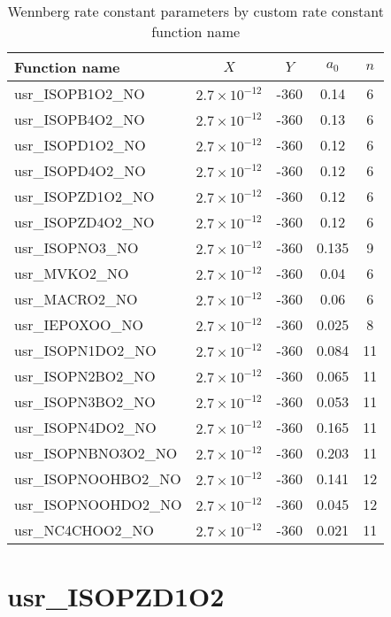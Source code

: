 \documentclass[titlepage]{article}
\begin{document}
\begin{table}
\centering
\caption{Wennberg  rate constant parameters by custom rate constant function name}
\label{tab:wennberg}
\begin{tabular}{l c c c c}
Function name & $X$ & $Y$ & $a_0$ & $n$ \\
\hline
usr\_ISOPB1O2\_NO   & $2.7 \times 10^{-12}$ & -360 & 0.14   & 6 \\
usr\_ISOPB4O2\_NO   & $2.7 \times 10^{-12}$ & -360 & 0.13   & 6 \\
usr\_ISOPD1O2\_NO   & $2.7 \times 10^{-12}$ & -360 & 0.12   & 6 \\
usr\_ISOPD4O2\_NO   & $2.7 \times 10^{-12}$ & -360 & 0.12   & 6 \\
usr\_ISOPZD1O2\_NO & $2.7 \times 10^{-12}$ & -360 & 0.12   & 6 \\
usr\_ISOPZD4O2\_NO & $2.7 \times 10^{-12}$ & -360 & 0.12   & 6 \\
usr\_ISOPNO3\_NO     & $2.7 \times 10^{-12}$ & -360 & 0.135 & 9 \\
usr\_MVKO2\_NO        & $2.7 \times 10^{-12}$ & -360 & 0.04   & 6 \\
usr\_MACRO2\_NO      & $2.7 \times 10^{-12}$ & -360 & 0.06  & 6 \\
usr\_IEPOXOO\_NO     & $2.7 \times 10^{-12}$ & -360 & 0.025 & 8 \\
usr\_ISOPN1DO2\_NO & $2.7 \times 10^{-12}$ & -360 & 0.084 & 11 \\
usr\_ISOPN2BO2\_NO & $2.7 \times 10^{-12}$ & -360 & 0.065 & 11 \\
usr\_ISOPN3BO2\_NO & $2.7 \times 10^{-12}$ & -360 & 0.053 & 11 \\
usr\_ISOPN4DO2\_NO & $2.7 \times 10^{-12}$ & -360 & 0.165 & 11 \\
usr\_ISOPNBNO3O2\_NO & $2.7 \times 10^{-12}$ & -360 & 0.203 & 11 \\
usr\_ISOPNOOHBO2\_NO & $2.7 \times 10^{-12}$ & -360 & 0.141 & 12 \\
usr\_ISOPNOOHDO2\_NO & $2.7 \times 10^{-12}$ & -360 & 0.045 & 12 \\
usr\_NC4CHOO2\_NO & $2.7 \times 10^{-12}$ & -360 & 0.021 & 11 \\
\hline
\end{tabular}
\end{table}


\section{usr\_ISOPZD1O2}
\end{document}

